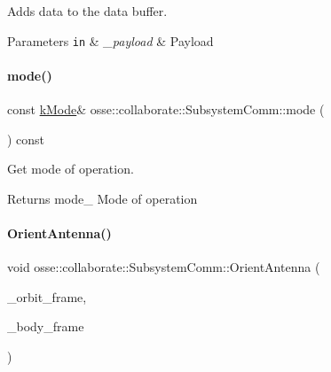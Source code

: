 Adds data to the data buffer. 


\begin{DoxyParams}[1]{Parameters}
\mbox{\tt in}  & {\em \+\_\+payload} & Payload \\
\hline
\end{DoxyParams}
\mbox{\label{classosse_1_1collaborate_1_1_subsystem_comm_adaba2e0c3b3704a4ece62137d609adff}} 
\paragraph{\texorpdfstring{mode()}{mode()}}
{\footnotesize\ttfamily const \hyperlink{classosse_1_1collaborate_1_1_subsystem_comm_a5e1ce4f232ca2aae0b99d1225e682190}{k\+Mode}\& osse\+::collaborate\+::\+Subsystem\+Comm\+::mode (\begin{DoxyParamCaption}{ }\end{DoxyParamCaption}) const\hspace{0.3cm}{\ttfamily [inline]}}



Get mode of operation. 

\begin{DoxyReturn}{Returns}
mode\+\_\+ Mode of operation 
\end{DoxyReturn}
\mbox{\label{classosse_1_1collaborate_1_1_subsystem_comm_a8f806bb513c9b15ce8f8a345856ca33b}} 
\paragraph{\texorpdfstring{Orient\+Antenna()}{OrientAntenna()}}
{\footnotesize\ttfamily void osse\+::collaborate\+::\+Subsystem\+Comm\+::\+Orient\+Antenna (\begin{DoxyParamCaption}\item[{const \hyperlink{classosse_1_1collaborate_1_1_reference_frame}{Reference\+Frame} \&}]{\+\_\+orbit\+\_\+frame,  }\item[{const \hyperlink{classosse_1_1collaborate_1_1_reference_frame}{Reference\+Frame} \&}]{\+\_\+body\+\_\+frame }\end{DoxyParamCaption})}



